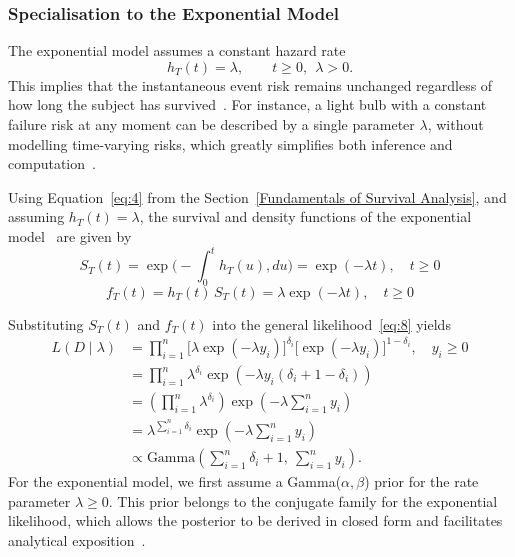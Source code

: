 \subsubsection{Specialisation to the Exponential Model}
\label{指数模型贝叶斯推断过程}
The exponential model assumes a constant hazard rate
\begin{equation}
h_T(t)=\lambda,\qquad t\ge 0,\ \ \lambda>0 .
\end{equation}
This implies that the instantaneous event risk remains unchanged regardless of how long the subject has survived~\cite{lawless2011statistical, ibrahim2013bayesian}. For instance, a light bulb with a constant failure risk at any moment can be described by a single parameter $\lambda$, without modelling time-varying risks, which greatly simplifies both inference and computation~\cite{lawless2011statistical}.

Using Equation~\eqref{eq:4} from the Section~\ref{Fundamentals of Survival Analysis}, and assuming $h_T(t) = \lambda$, the survival and density functions of the exponential model~\cite{kleinbaum1996survival} are given by
\begin{equation}
    S_T(t) = \exp\Big( -\displaystyle\int_0^t h_T(u), du \Big)=\exp(-\lambda t), \quad t \ge 0
    \label{St_exp}
\end{equation}
\begin{equation}
    f_T(t) = h_T(t)\, S_T(t)=\lambda \exp(-\lambda t), \quad t \ge 0
    \label{ft_exp}
\end{equation}

Substituting $S_T(t)$ and $f_T(t)$ into the general likelihood~\eqref{eq:8} yields~\cite{ibrahim2013bayesian}
\begin{align}
L(D \mid \lambda)
&=\prod_{i=1}^{n}
\big[\lambda \exp(-\lambda y_i)\big]^{\delta_i}
\big[\exp(-\lambda y_i)\big]^{1-\delta_i}, \quad y_i \ge 0 \\
&=
\prod_{i=1}^{n}
\lambda^{\delta_i}
\exp\left(
-\lambda y_i (\delta_i + 1 - \delta_i)
\right) \\
&=
\left(
\prod_{i=1}^{n}
\lambda^{\delta_i}
\right)
\exp\left(
-\lambda \sum_{i=1}^{n} y_i
\right)\\
&=
\lambda^{\sum_{i=1}^{n} \delta_i}
\exp\left(
-\lambda \sum_{i=1}^{n} y_i
\right)\\
&\propto
\text{Gamma}
\left(
\sum_{i=1}^{n} \delta_i + 1,\ \sum_{i=1}^{n} y_i
\right).
\end{align}
For the exponential model, we first assume a Gamma($\alpha, \beta$) prior for the rate parameter $\lambda \ge 0$. This prior belongs to the conjugate family for the exponential likelihood, which allows the posterior to be derived in closed form and facilitates analytical exposition~\cite{kalbfleisch2002statistical}.

